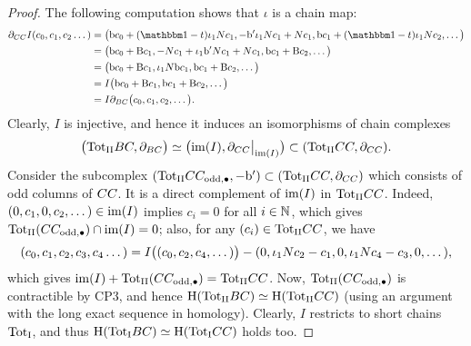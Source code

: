 \documentclass[\MainFolder/Text.tex]{subfiles}
\begin{document}
\begin{proof}
The following computation shows that $\iota$ is a chain map:
\begin{align*}
\Bdd_{\LodCycBi}I(c_0,c_1,c_2\dotsc)&= \bigl(\Hd c_0 + (\Id-\CycPermOp)\InsOneOp_1\CountOp c_1, - \Hd'\InsOneOp_1\CountOp c_1 + \CountOp c_1, \Hd c_1 + (\Id-\CycPermOp)\InsOneOp_1 \CountOp c_2, \dotsc \bigr)\\
&= \bigl(\Hd c_0 + \Cd c_1, -\CountOp c_1 + \InsOneOp_1 \Hd' \CountOp c_1 + \CountOp c_1 ,\Hd c_1 + \Cd c_2,\dotsc\bigr) \\
&= \bigl(\Hd c_0 + \Cd c_1, \InsOneOp_1 \CountOp \Hd c_1,\Hd c_1 + \Cd c_2,\dotsc\bigr) \\
&= I\bigl(\Hd c_0 + \Cd c_1, \Hd c_1 + \Cd c_2, \dotsc \bigr) \\ 
&= I\Bdd_{\ConCycBi}\bigl(c_0,c_1,c_2,\dotsc\bigr).
\end{align*}
Clearly, $I$ is injective, and hence it induces an isomorphisms of chain complexes 
$$ \bigl(\TotII\ConCycBi,\Bdd_{\ConCycBi}\bigr) \simeq \bigl(\im(I),\Restr{\Bdd_{\LodCycBi}}{\im(I)}\bigr)\subset (\TotII \LodCycBi, \Bdd_{\LodCycBi}). $$
Consider the subcomplex $({\mathrm{Tot}_{\mathrm{II}}} CC_{\mathrm{odd},\bullet},-{\mathrm{b}'})\subset ({\mathrm{Tot}_{\mathrm{II}}}CC,\partial_{CC})$ which consists of odd columns of $CC$. It is a direct complement of $\operatorname{im}(I)$ in ${\mathrm{Tot}_{\mathrm{II}}} CC$. Indeed, $(0,c_1,0,c_2,\dotsc) \in \operatorname{im}(I)$ implies $c_i = 0$ for all $i\in\mathbb{N}$, which gives ${\mathrm{Tot}_{\mathrm{II}}}(CC_{\mathrm{odd},\bullet}) \cap \operatorname{im}(I) = 0$; also, for any $(c_i)\in {\mathrm{Tot}_{\mathrm{II}}} CC$, we have
$$ (c_0, c_1, c_2, c_3, c_4 \dotsc ) = I\bigl((c_0, c_2, c_4, \dotsc )\bigr) - (0,\iota_1N c_2 - c_1 , 0, \iota_1N c_4 - c_3, 0, \dotsc), $$
which gives $\operatorname{im}(I) + {\mathrm{Tot}_{\mathrm{II}}}(CC_{\mathrm{odd},\bullet}) = {\mathrm{Tot}_{\mathrm{II}}} CC$. Now, ${\mathrm{Tot}_{\mathrm{II}}}(CC_{\mathrm{odd},\bullet})$ is contractible by CP3, and hence $\mathrm{H}({\mathrm{Tot}_{\mathrm{II}}} BC) \simeq \mathrm{H}({\mathrm{Tot}_{\mathrm{II}}} CC)$ (using an argument with the long exact sequence in homology). Clearly, $I$ restricts to short chains ${\mathrm{Tot}_{\mathrm{I}}}$, and thus $\mathrm{H}({\mathrm{Tot}_{\mathrm{I}}} BC) \simeq \mathrm{H}({\mathrm{Tot}_{\mathrm{I}}} CC)$ holds too.


\end{proof}
\end{document}
